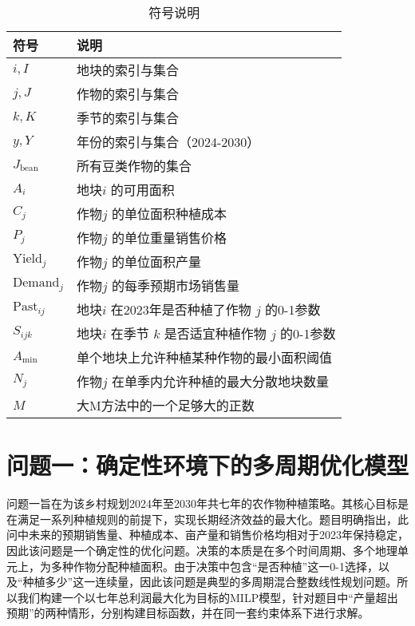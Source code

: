\documentclass[withoutpreface,bwprint]{cumcmthesis} %
\begin{document}
\begin{table}[H]
	\centering
	\caption{符号说明}
	\begin{tabular}{ll}
		\toprule
		符号                 & 说明                                \\
		\midrule

		$i, I$             & 地块的索引与集合                          \\
		$j, J$             & 作物的索引与集合                          \\
		$k, K$             & 季节的索引与集合                          \\
		$y, Y$             & 年份的索引与集合（2024-2030）               \\
		$J_{\text{bean}}$  & 所有豆类作物的集合                         \\

		$A_i$              & 地块$i$ 的可用面积                       \\
		$C_j$              & 作物$j$ 的单位面积种植成本                   \\
		$P_j$              & 作物$j$ 的单位重量销售价格                   \\
		$\text{Yield}_j$   & 作物$j$ 的单位面积产量                     \\
		$\text{Demand}_j$  & 作物$j$ 的每季预期市场销售量                  \\
		$\text{Past}_{ij}$ & 地块$i$ 在2023年是否种植了作物 $j$ 的0-1参数    \\
		$S_{ijk}$          & 地块$i$ 在季节 $k$ 是否适宜种植作物 $j$ 的0-1参数 \\
		$A_{\min}$         & 单个地块上允许种植某种作物的最小面积阈值              \\
		$N_j$              & 作物$j$ 在单季内允许种植的最大分散地块数量           \\
		$M$                & 大M方法中的一个足够大的正数                    \\
		\bottomrule
	\end{tabular}
\end{table}




\section{问题一：确定性环境下的多周期优化模型}

问题一旨在为该乡村规划2024年至2030年共七年的农作物种植策略。其核心目标是在满足一系列种植规则的前提下，实现长期经济效益的最大化。题目明确指出，此问中未来的预期销售量、种植成本、亩产量和销售价格均相对于2023年保持稳定，因此该问题是一个确定性的优化问题。决策的本质是在多个时间周期、多个地理单元上，为多种作物分配种植面积。由于决策中包含“是否种植”这一0-1选择，以及“种植多少”这一连续量，因此该问题是典型的多周期混合整数线性规划问题。所以我们构建一个以七年总利润最大化为目标的MILP模型，针对题目中“产量超出预期”的两种情形，分别构建目标函数，并在同一套约束体系下进行求解。
\end{document}
